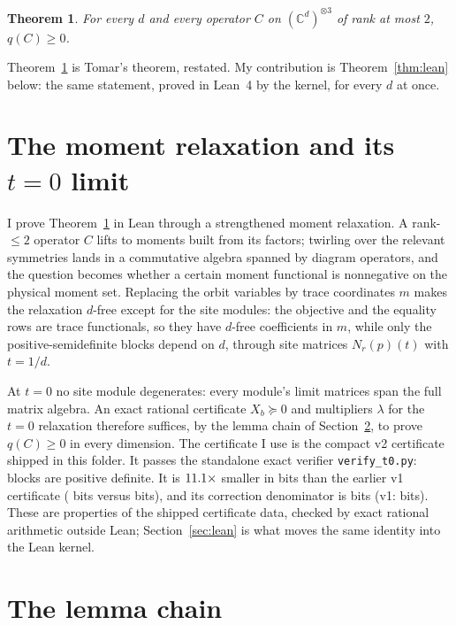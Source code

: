 \documentclass[11pt]{article}
\newtheorem{theorem}{Theorem}
\theoremstyle{remark}
\newcommand{\C}{\mathbb{C}}
\begin{document}
\begin{theorem}\label{thm:main}
For every $d$ and every operator $C$ on $(\C^d)^{\otimes 3}$ of rank at
most $2$, $q(C) \ge 0$.
\end{theorem}

Theorem~\ref{thm:main} is Tomar's theorem, restated.
My contribution is Theorem~\ref{thm:lean} below:
the same statement, proved in Lean~4 by the kernel, for every $d$ at once.

\section{The moment relaxation and its $t = 0$ limit}

I prove Theorem~\ref{thm:main} in Lean through a strengthened moment
relaxation.
A rank-$\le 2$ operator $C$ lifts to moments built from its factors;
twirling over the relevant symmetries lands in a commutative algebra
spanned by diagram operators, and the question becomes whether a certain
moment functional is nonnegative on the physical moment set.
Replacing the orbit variables by trace coordinates $m$ makes
the relaxation $d$-free except for the site modules: the objective and
the equality rows are trace functionals, so they have $d$-free
coefficients in $m$, while only the positive-semidefinite blocks depend
on $d$, through site matrices $N_r(p)(t)$ with $t = 1/d$.

At $t = 0$ no site module degenerates: every module's limit matrices
span the full matrix algebra. An exact rational certificate
$X_b \succeq 0$ and multipliers $\lambda$ for the $t = 0$ relaxation
therefore suffices, by the lemma chain of Section~\ref{sec:chain},
to prove $q(C) \ge 0$ in every dimension.
The certificate I use is the compact v2 certificate shipped in this
folder. It passes the standalone exact verifier \texttt{verify\_t0.py}:
\nblocks{} blocks are positive definite.
It is $11.1{}\times$ smaller in bits than the earlier v1 certificate
(\certbits{} bits versus \vonebits{} bits), and its correction
denominator is \dendelbits{} bits (v1: \vonedendelbits{} bits).
These are properties of the shipped certificate data, checked by exact
rational arithmetic outside Lean; Section~\ref{sec:lean} is what moves
the same identity into the Lean kernel.

\section{The lemma chain}\label{sec:chain}
\end{document}
